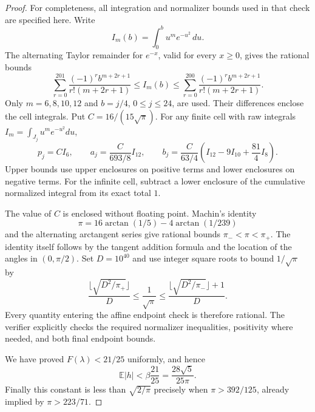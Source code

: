 \documentclass[11pt]{article}
\newcommand{\E}{\mathbb E}
\begin{document}
\begin{proof}
For completeness, all integration and normalizer bounds used in that
check are specified here. Write
\[
 I_m(b)=\int_0^b u^me^{-u^2}\,du.
\]
The alternating Taylor remainder for $e^{-x}$, valid for every $x\geq0$,
gives the rational bounds
\[
 \sum_{r=0}^{201}\frac{(-1)^r b^{m+2r+1}}{r!(m+2r+1)}
 \leq I_m(b)\leq
 \sum_{r=0}^{200}\frac{(-1)^r b^{m+2r+1}}{r!(m+2r+1)}.
\]
Only $m=6,8,10,12$ and $b=j/4$, $0\leq j\leq24$, are used. Their
differences enclose the cell integrals. Put $C=16/(15\sqrt\pi)$.
For any finite cell with raw integrals $I_m=\int_{J_j}u^me^{-u^2}du$,
\[
 p_j=CI_6,\qquad a_j=\frac{C}{693/8}I_{12},\qquad
 b_j=\frac{C}{63/4}\left(I_{12}-9I_{10}+\frac{81}{4}I_8\right).
\]
Upper bounds use upper enclosures on positive terms and lower enclosures
on negative terms. For the infinite cell, subtract a lower enclosure of
the cumulative normalized integral from its exact total $1$.

The value of $C$ is enclosed without floating point. Machin's identity
\[
 \pi=16\arctan(1/5)-4\arctan(1/239)
\]
and the alternating arctangent series give rational bounds
$\pi_-<\pi<\pi_+$. The identity itself follows by the tangent addition
formula and the location of the angles in $(0,\pi/2)$.
Set $D=10^{40}$ and use integer square roots to bound $1/\sqrt\pi$ by
\[
 \frac{\lfloor\sqrt{D^2/\pi_+}\rfloor}{D}
 \leq\frac1{\sqrt\pi}\leq
 \frac{\lfloor\sqrt{D^2/\pi_-}\rfloor+1}{D}.
\]
Every quantity entering the affine endpoint check is therefore rational.
The verifier explicitly checks the required normalizer inequalities,
positivity where needed, and both final endpoint bounds.

We have proved $F(\lambda)<21/25$ uniformly, and hence
\[
 \E|h|<\beta\frac{21}{25}=\frac{28\sqrt5}{25\pi}.
\]
Finally this constant is less than $\sqrt{2/\pi}$ precisely when
$\pi>392/125$, already implied by $\pi>223/71$.
\end{proof}
\end{document}
